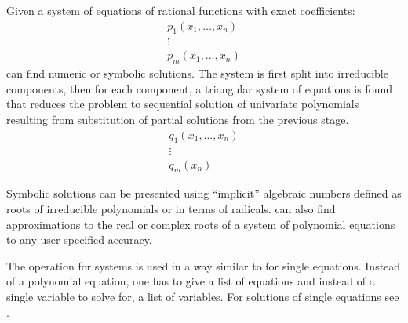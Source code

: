 {{{{{{{{{{{{Given a system of equations of rational functions with exact coefficients:
\begin{displaymath}
\begin{array}{c}
p_1(x_1, \ldots, x_n) \\ \vdots \\ p_m(x_1,\ldots,x_n)
\end{array}
\end{displaymath}
\Language{} can find
numeric or symbolic solutions.
The system is first split into irreducible components, then for
each component, a triangular system of equations is found that reduces
the problem to sequential solution of univariate polynomials resulting
from substitution of partial solutions from the previous stage.
\begin{displaymath}
\begin{array}{c}
q_1(x_1, \ldots, x_n) \\ \vdots \\ q_m(x_n)
\end{array}
\end{displaymath}

Symbolic solutions can be presented using ``implicit'' algebraic numbers
defined as roots of irreducible polynomials or in terms of radicals.
\Language{} can also find approximations to the real or complex roots
of a system of polynomial equations to any user-specified accuracy.

The operation  for systems is used in a way similar
to  for single equations.
Instead of a polynomial equation, one has to give a list of
equations and instead of a single variable to solve for, a list of
variables.
For solutions of single equations see .

}}}}}}}}}}}}
